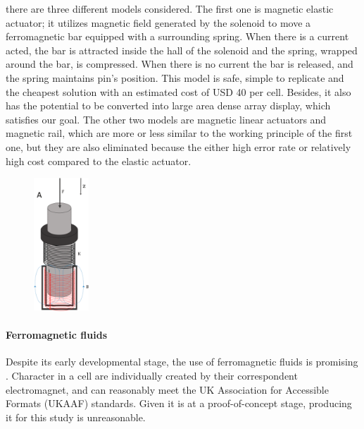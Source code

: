 there are three different models considered. The first one is magnetic elastic actuator; it utilizes magnetic field generated by the solenoid to move a ferromagnetic bar equipped with a surrounding spring. When there is a current acted, the bar is attracted inside the hall of the solenoid and the spring, wrapped around the bar, is compressed.
When there is no current the bar is released, and the spring maintains pin's position. This model is safe, simple to replicate and the cheapest solution with an estimated cost of USD 40 per cell.
Besides, it also has the potential to be converted into large area dense array display, which satisfies our goal. The other two models are magnetic linear actuators and magnetic rail, which are more or less similar to the working principle of the first one, but they are also eliminated because the either high error rate or relatively high cost compared to the elastic actuator.

\begin{figure} \centering
    \includegraphics[height=5cm]{figures/magnetic-spring.png}
\caption{}
\label{fig:magnetic-spring.png}
\end{figure}

\paragraph{Ferromagnetic fluids}
Despite its early developmental stage, the use of ferromagnetic fluids is promising \cite{fletcher_magnetic_2021}.
Character in a cell are individually created by their correspondent electromagnet, and can reasonably meet the UK Association for Accessible Formats (UKAAF) standards.
Given it is at a proof-of-concept stage, producing it for this study is unreasonable.